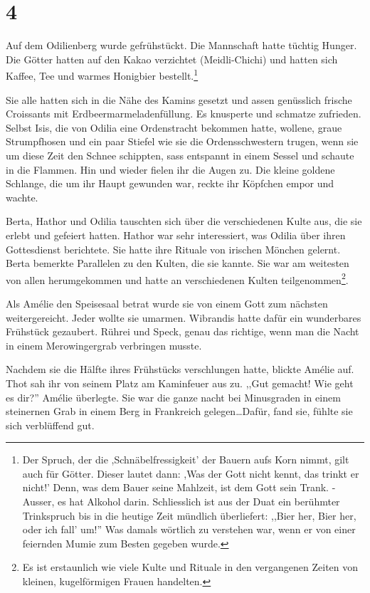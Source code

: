 \section*{4}

Auf dem Odilienberg wurde gefrühstückt. Die Mannschaft hatte tüchtig Hunger. Die Götter hatten auf den Kakao verzichtet (Meidli-Chichi) und hatten sich Kaffee, Tee und warmes Honigbier bestellt.\footnote{Der Spruch, der die ,Schnäbelfressigkeit' der Bauern aufs Korn nimmt, gilt auch für Götter. Dieser lautet dann: ,Was der Gott nicht kennt, das trinkt er nicht!' Denn, was dem Bauer seine Mahlzeit, ist dem Gott sein Trank. -Ausser, es hat Alkohol darin. Schliesslich ist aus der Duat ein berühmter Trinkspruch bis in die heutige Zeit mündlich überliefert: ,,Bier her, Bier her, oder ich fall' um!'' Was damals wörtlich zu verstehen war, wenn er von einer feiernden Mumie zum Besten gegeben wurde. } 

Sie alle hatten sich in die Nähe des Kamins gesetzt und assen genüsslich frische Croissants mit Erdbeermarmeladenfüllung. Es knusperte und schmatze zufrieden. Selbst Isis, die von Odilia eine Ordenstracht bekommen hatte, wollene, graue Strumpfhosen und ein paar Stiefel wie sie die Ordensschwestern trugen, wenn sie um diese Zeit den Schnee schippten, sass entspannt in einem Sessel und schaute in die Flammen. Hin und wieder fielen ihr die Augen zu. Die kleine goldene Schlange, die um ihr Haupt gewunden war, reckte ihr Köpfchen empor und wachte.

Berta, Hathor und Odilia tauschten sich über die verschiedenen Kulte aus, die sie erlebt und gefeiert hatten. Hathor war sehr interessiert, was Odilia über ihren Gottesdienst berichtete. Sie hatte ihre Rituale von irischen Mönchen gelernt. Berta bemerkte Parallelen zu den Kulten, die sie kannte. Sie war am weitesten von allen herumgekommen und hatte an verschiedenen Kulten teilgenommen\footnote{Es ist erstaunlich wie viele Kulte und Rituale in den vergangenen Zeiten von kleinen, kugelförmigen Frauen handelten.}. 

Als Amélie den Speisesaal betrat wurde sie von einem Gott zum nächsten weitergereicht. Jeder wollte sie umarmen. Wibrandis hatte dafür ein wunderbares Frühstück gezaubert. Rührei und Speck, genau das richtige, wenn man die Nacht in einem Merowingergrab verbringen musste.

Nachdem sie die Hälfte ihres Frühstücks verschlungen hatte, blickte Amélie auf. Thot sah ihr von seinem Platz am Kaminfeuer aus zu. ,,Gut gemacht! Wie geht es dir?'' Amélie überlegte. Sie war die ganze nacht bei Minusgraden in einem steinernen Grab in einem Berg in Frankreich gelegen\dots Dafür, fand sie, fühlte sie sich verblüffend gut.

